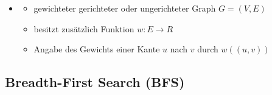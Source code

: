 \documentclass[
    12pt,
    a4paper,
    ngerman,
    color=3b,%
    marginpar=false,
    colorback=false,
    leqno,
]{tudaexercise}
\begin{document}
\begin{itemize}
        \item {}
            \begin{itemize}
                \item gewichteter gerichteter oder ungerichteter Graph $G=(V,E)$
                \item besitzt zusätzlich Funktion $w: E \rightarrow R$
                \item Angabe des Gewichts einer Kante $u$ nach $v$ durch $w((u,v))$
            \end{itemize}
    \end{itemize}

\subsection{Breadth-First Search (BFS)}
\end{document}
